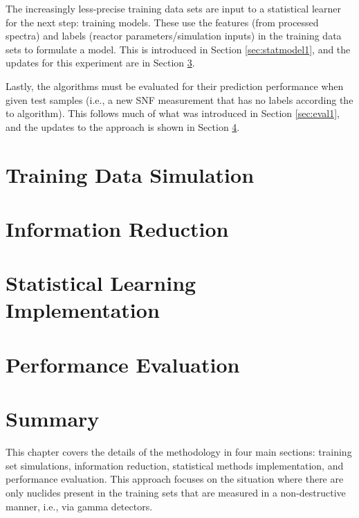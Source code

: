 The increasingly less-precise training data sets are input to a statistical
learner for the next step: training models.  These use the features (from
processed spectra) and labels (reactor parameters/simulation inputs) in the
training data sets to formulate a model.  This is introduced in Section
\ref{sec:statmodel1}, and the updates for this experiment are in Section
\ref{sec:statmodel2}. 

Lastly, the algorithms must be evaluated for their prediction performance when
given test samples (i.e., a new \gls{SNF} measurement that has no labels
according the to algorithm).  This follows much of what was introduced in
Section \ref{sec:eval1}, and the updates to the approach is shown in Section
\ref{sec:eval2}. 

\section{Training Data Simulation}
\label{sec:training2}


\section{Information Reduction}
\label{sec:inforeduc2}


\section{Statistical Learning Implementation}
\label{sec:statmodel2}


\section{Performance Evaluation}
\label{sec:eval2}


\section{Summary}


This chapter covers the details of the methodology in four main sections:
training set simulations, information reduction, statistical methods
implementation, and performance evaluation. This approach focuses on the
situation where there are only nuclides present in the training sets that 
are measured in a non-destructive manner, i.e., via gamma detectors. 

